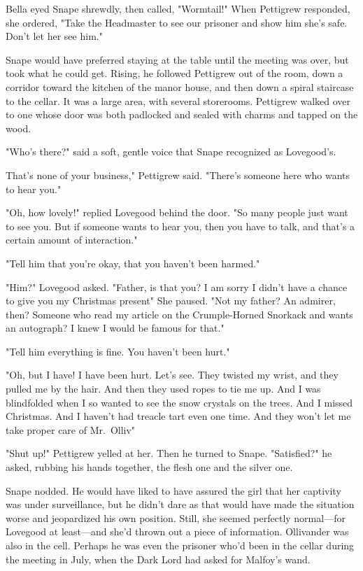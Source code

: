 Bella eyed Snape shrewdly, then called, "Wormtail!" When Pettigrew responded, she ordered, "Take the Headmaster to see our prisoner and show him she's safe. Don't let her see him."

Snape would have preferred staying at the table until the meeting was over, but took what he could get. Rising, he followed Pettigrew out of the room, down a corridor toward the kitchen of the manor house, and then down a spiral staircase to the cellar. It was a large area, with several storerooms. Pettigrew walked over to one whose door was both padlocked and sealed with charms and tapped on the wood.

"Who's there?" said a soft, gentle voice that Snape recognized as Lovegood's.

That's none of your business," Pettigrew said. "There's someone here who wants to hear you."

"Oh, how lovely!" replied Lovegood behind the door. "So many people just want to see you. But if someone wants to hear you, then you have to talk, and that's a certain amount of interaction."

"Tell him that you're okay, that you haven't been harmed."

"Him?" Lovegood asked. "Father, is that you? I am sorry I didn't have a chance to give you my Christmas present{\el}" She paused. "Not my father? An admirer, then? Someone who read my article on the Crumple-Horned Snorkack and wants an autograph? I knew I would be famous for that."

"Tell him everything is fine. You haven't been hurt."

"Oh, but I have! I have been hurt. Let's see. They twisted my wrist, and they pulled me by the hair. And then they used ropes to tie me up. And I was blindfolded when I so wanted to see the snow crystals on the trees. And I missed Christmas. And I haven't had treacle tart even one time. And they won't let me take proper care of Mr.~Olliv{\el}"

"Shut up!" Pettigrew yelled at her. Then he turned to Snape. "Satisfied?" he asked, rubbing his hands together, the flesh one and the silver one.

Snape nodded. He would have liked to have assured the girl that her captivity was under surveillance, but he didn't dare as that would have made the situation worse and jeopardized his own position. Still, she seemed perfectly normal—for Lovegood at least—and she'd thrown out a piece of information. Ollivander was also in the cell. Perhaps he was even the prisoner who'd been in the cellar during the meeting in July, when the Dark Lord had asked for Malfoy's wand.

